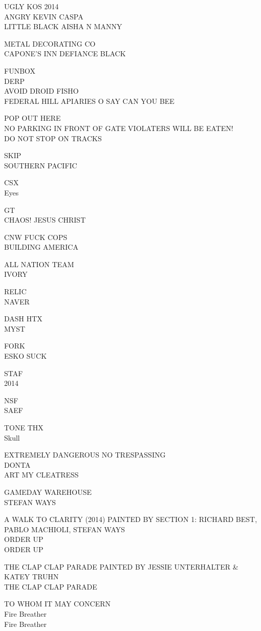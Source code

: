 \documentclass[10pt,letterpaper]{article}
\begin{document}
UGLY KOS 2014\\
ANGRY KEVIN CASPA\\
LITTLE BLACK AISHA N MANNY

METAL DECORATING CO\\
CAPONE'S INN DEFIANCE BLACK

FUNBOX\\
DERP\\
AVOID DROID FISHO\\
FEDERAL HILL APIARIES O SAY CAN YOU BEE

POP OUT HERE\\
NO PARKING IN FRONT OF GATE VIOLATERS WILL BE EATEN!\\
DO NOT STOP ON TRACKS

SKIP\\
SOUTHERN PACIFIC

CSX\\
Eyes

GT\\
CHAOS!  JESUS CHRIST

CNW FUCK COPS\\
BUILDING AMERICA

ALL NATION TEAM\\
IVORY

RELIC\\
NAVER

DASH HTX\\
MYST

FORK\\
ESKO SUCK

STAF\\
2014

NSF\\
SAEF

TONE THX\\
Skull

EXTREMELY DANGEROUS NO TRESPASSING\\
DONTA\\
ART MY CLEATRESS

GAMEDAY WAREHOUSE\\
STEFAN WAYS

A WALK TO CLARITY (2014) PAINTED BY SECTION 1: RICHARD BEST, PABLO MACHIOLI, STEFAN WAYS\\
ORDER UP\\
ORDER UP

THE CLAP CLAP PARADE PAINTED BY JESSIE UNTERHALTER \& KATEY TRUHN\\
THE CLAP CLAP PARADE

TO WHOM IT MAY CONCERN\\
Fire Breather\\
Fire Breather
\end{document}
